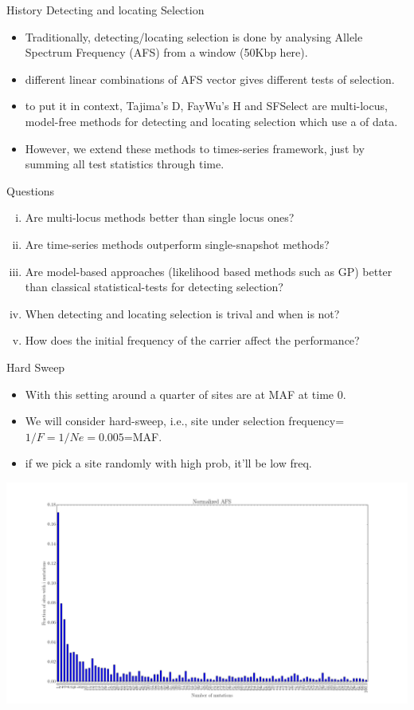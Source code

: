 \documentclass[t]{beamer} %
\begin{document}
\begin{frame}{History Detecting and locating Selection}
\begin{itemize}
\item Traditionally, detecting/locating selection is done by analysing Allele Spectrum Frequency (AFS) from a window (50Kbp here).
\item different linear combinations of AFS vector gives different tests of selection.
\item to put it in context, Tajima's D, FayWu's H and SFSelect are multi-locus, model-free methods for detecting and locating selection which use a  of data.
\item However, we extend these methods to times-series framework, just by summing all test statistics through time.
\end{itemize}
\end{frame}


\begin{frame}{Questions}
\begin{enumerate}[(i)]
\item Are multi-locus methods better than single locus ones?
\item Are time-series methods outperform single-snapshot methods?
\item Are model-based approaches (likelihood based methods such as GP) better than classical  statistical-tests for detecting selection?
\item When detecting and locating selection is trival and when is not?
\item How does the initial frequency of the carrier affect the performance?
\end{enumerate}


\end{frame}

\begin{frame}{Hard Sweep}
\begin{itemize}
\item With this setting around a quarter of sites are at MAF at time 0.
\item We will consider hard-sweep, i.e., site under selection frequency=$1/F=1/Ne=0.005$=MAF. 
\item if we pick a site randomly with high prob, it'll be low freq.
\end{itemize}
\hspace{-0in}\includegraphics[scale=0.17]{AFS}
\end{frame}
\end{document}
